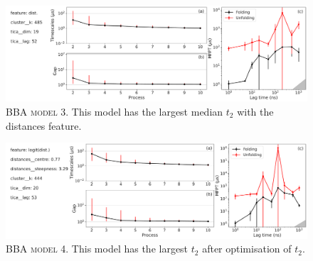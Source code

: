 \documentclass{article}
\begin{document}
\begin{figure}
    \centering
    \includegraphics[width=\columnwidth]{SI_figures/BBA_58_SI-1.pdf}
    \caption{\textsc{BBA model 3.} This model has the largest median $t_{2}$ with the distances feature.}
    \label{si_fig:BBA_58_1}
\end{figure}


\begin{figure}
    \centering
    \includegraphics[width=\columnwidth]{SI_figures/BBA_227_SI-1.pdf}
    \caption{\textsc{BBA model 4.} This model has the largest $t_2$ after optimisation of $t_{2}$.}
    \label{si_fig:BBA_227_2}
\end{figure}




\end{document}
